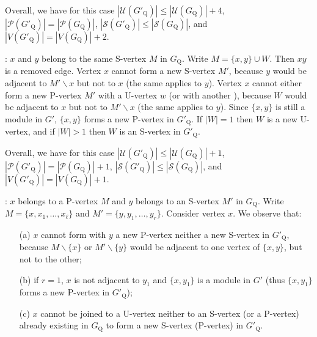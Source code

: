 \documentclass[12pt]{article}
\begin{document}
Overall,
we have for this case
$|{\mathcal U}(G'_{\mathrm Q})| \leq |{\mathcal U}(G_{\mathrm Q})|+4$,
$|{\mathcal P}(G'_{\mathrm Q})| = |{\mathcal P}(G_{\mathrm Q})|$,
$|{\mathcal S}(G'_{\mathrm Q})| \leq |{\mathcal S}(G_{\mathrm Q})|$, and
$|V(G'_{\mathrm Q})|=|V(G_{\mathrm Q})|+2.$

\medskip

: $x$ and $y$ belong to the same S-vertex $M$ in $G_{\mathrm Q}$.
Write $M=\{x,y\} \cup W$. Then $xy$ is a removed edge. Vertex $x$ cannot form a new S-vertex $M'$, because $y$ would be adjacent to $M' \backslash x$ but not to $x$ (the same applies to $y$). Vertex $x$ cannot either form a new P-vertex $M'$ with a U-vertex $w$ (or with another ), because $W$ would be adjacent to $x$  but not to $M'\backslash x$ (the same applies to $y$). Since $\{x,y\}$ is still a module in $G'$, $\{x,y\}$  forms a new P-vertex in $G'_{\mathrm Q}$. If $|W|=1$ then $W$ is a new U-vertex, and if $|W|>1$ then $W$ is an S-vertex in $G'_{\mathrm Q}$.

Overall,
we have for this case
$|{\mathcal U}(G'_{\mathrm Q})| \leq |{\mathcal U}(G_{\mathrm Q})|+1$,
$|{\mathcal P}(G'_{\mathrm Q})| = |{\mathcal P}(G_{\mathrm Q})|+1$,
$|{\mathcal S}(G'_{\mathrm Q})| \leq |{\mathcal S}(G_{\mathrm Q})|$, and
$|V(G'_{\mathrm Q})|=|V(G_{\mathrm Q})|+1.$

\medskip

: $x$ belongs to a P-vertex $M$ and $y$
belongs to an S-vertex $M'$ in  $G_{\mathrm Q}$.
Write $M=\{x,x_1,\ldots,x_{\ell}\}$ and $M'=\{y,y_1,\ldots,y_r\}$. Consider vertex $x$. We observe that:

\begin{itemize}
\item[(a)] $x$ cannot form with $y$ a new P-vertex neither a new S-vertex in $G'_{\mathrm Q}$, because $M\backslash \{x\}$ or $M'\backslash\{y\}$ would be adjacent to one vertex of $\{x,y\}$, but not to the other;

\item[(b)] if $r=1$, $x$ is not adjacent to $y_1$ and $\{x,y_1\}$ is a module in $G'$ (thus $\{x,y_1\}$ forms a new P-vertex in $G'_{\mathrm Q}$);

\item[(c)] $x$ cannot be joined to a U-vertex neither to an S-vertex (or a P-vertex) already existing in $G_{\mathrm Q}$ to form a new S-vertex (P-vertex) in $G'_{\mathrm Q}$.
\end{itemize}
\end{document}

